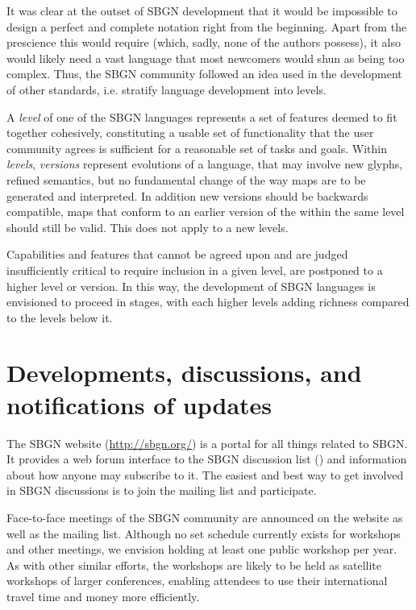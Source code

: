 It was clear at the outset of SBGN development that it would be impossible 
to design a perfect and complete notation right from the beginning.  Apart 
from the prescience this would require (which, sadly, none of the authors 
possess), it also would likely need a vast language that most newcomers 
would shun as being too complex.  Thus, the SBGN community followed an idea 
used in the development of other standards, i.e. stratify language 
development into levels.

A \emph{level} of one of the SBGN languages represents a set of
features deemed to fit together cohesively, constituting a usable set
of functionality that the user community agrees is sufficient for a
reasonable set of tasks and goals.  Within \emph{levels},
\emph{versions} represent evolutions of a language, that may
involve new glyphs, refined semantics, but no fundamental change of
the way maps are to be generated and interpreted. In addition new
versions should be backwards compatible, \ie \PD maps that conform to
an earlier version of the \PDl within the same level should still be
valid.  This does not apply to a new levels. 

Capabilities and features that cannot be agreed upon and are judged
insufficiently critical to require inclusion in a given level, are
postponed to a higher level or version.  In this way, the development
of SBGN languages is envisioned to proceed in stages, with each higher
levels adding richness compared to the levels below it.

\section{Developments, discussions, and notifications of updates}
\label{sec:discussions}

The SBGN website (\url{http://sbgn.org/}) is a portal for all things 
related to SBGN.  It provides a web forum interface to the SBGN discussion 
list () and information about how anyone 
may subscribe to it.  The easiest and best way to get involved in SBGN 
discussions is to join the mailing list and participate.

Face-to-face meetings of the SBGN community are announced on the website as 
well as the mailing list.  Although no set schedule currently exists for 
workshops and other meetings, we envision holding at least one public 
workshop per year.  As with other similar efforts, the workshops are likely 
to be held as satellite workshops of larger conferences, enabling attendees 
to use their international travel time and money more efficiently.

